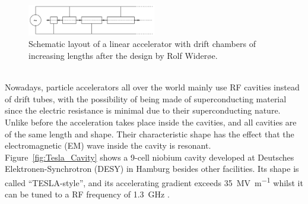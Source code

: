 \begin{figure}
\centering
\includegraphics[width=0.5\textwidth]{Figures/Wideroe_Linac.png}
\caption[Schematic layout of a Wider\o e linac]{Schematic layout of a linear accelerator with drift chambers of increasing lengths after the design by Rolf Wider\o e.~\cite[p. 40]{Hinterberger}}
\label{fig:Wideroe_Linac}
\end{figure}
\\Nowadays, particle accelerators all over the world mainly use RF cavities instead of drift tubes, with the possibility of being made of superconducting material since the electric resistance is minimal due to their superconducting nature.
Unlike before the acceleration takes place inside the cavities, and all cavities are of the same length and shape.
Their characteristic shape has the effect that the electromagnetic (EM) wave inside the cavity is resonant.
Figure~\ref{fig:Tesla_Cavity} shows a 9-cell niobium cavity developed at Deutsches Elektronen-Synchrotron (DESY) in Hamburg besides other facilities.
Its shape is called ``TESLA-style'', and its accelerating gradient exceeds \SI{35}{\mega\volt\per\meter} whilst it can be tuned to a RF frequency of \SI{1.3}{\giga\hertz} .~\cite[p. 15f]{TDR31}
